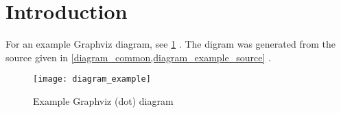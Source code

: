 \section{Introduction}


For an example Graphviz diagram, see
\cref{diagram_example}%
.
The digram was generated from the source given in
\cref{diagram_common,diagram_example_source}%
.

\begin{figure}[h]
    \centering
    \texttt{[image: diagram\_example]}
    \caption{Example Graphviz (dot) diagram}
    \label{diagram_example}
\end{figure}



